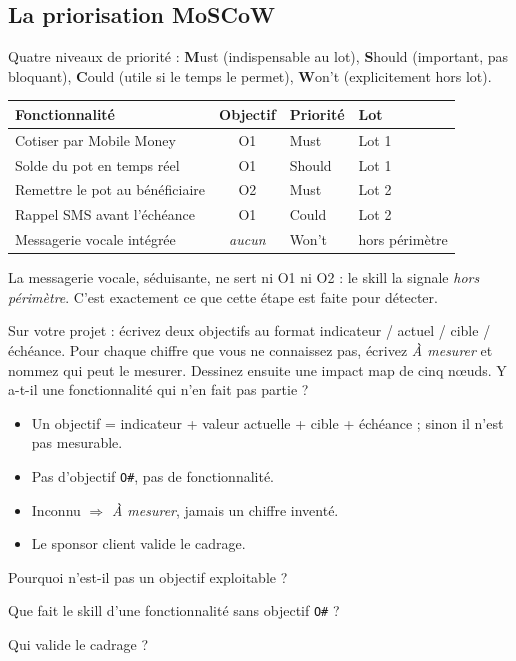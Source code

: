 \subsection*{La priorisation MoSCoW}
\begin{concept}[MoSCoW]
Quatre niveaux de priorité : \textbf{M}ust (indispensable au lot), \textbf{S}hould (important, pas bloquant),
\textbf{C}ould (utile si le temps le permet), \textbf{W}on't (explicitement hors lot).
\end{concept}
\noindent\begin{tabularx}{\linewidth}{Xcll}
\toprule
\textbf{Fonctionnalité} & \textbf{Objectif} & \textbf{Priorité} & \textbf{Lot} \\ \midrule
Cotiser par Mobile Money & O1 & Must & Lot 1 \\
Solde du pot en temps réel & O1 & Should & Lot 1 \\
Remettre le pot au bénéficiaire & O2 & Must & Lot 2 \\
Rappel SMS avant l'échéance & O1 & Could & Lot 2 \\
Messagerie vocale intégrée & \textit{aucun} & Won't & hors périmètre \\
\bottomrule
\end{tabularx}
La messagerie vocale, séduisante, ne sert ni O1 ni O2 : le skill la signale \emph{hors périmètre}. C'est exactement
ce que cette étape est faite pour détecter.

\begin{vousjouez}
Sur votre projet : écrivez deux objectifs au format indicateur / actuel / cible / échéance. Pour chaque
chiffre que vous ne connaissez pas, écrivez \emph{À mesurer} et nommez qui peut le mesurer. Dessinez
ensuite une impact map de cinq nœuds. Y a-t-il une fonctionnalité  qui n'en fait pas partie ?
\end{vousjouez}

\begin{retenir}[À retenir]
\begin{itemize}
  \item Un objectif = indicateur + valeur actuelle + cible + échéance ; sinon il n'est pas mesurable.
  \item Pas d'objectif \texttt{O\#}, pas de fonctionnalité.
  \item Inconnu $\Rightarrow$ \emph{À mesurer}, jamais un chiffre inventé.
  \item Le sponsor client valide le cadrage.
\end{itemize}
\end{retenir}

\begin{acquis}
  \item Pourquoi  n'est-il pas un objectif exploitable ?
  \item Que fait le skill d'une fonctionnalité sans objectif \texttt{O\#} ?
  \item Qui valide le cadrage ?
\end{acquis}
